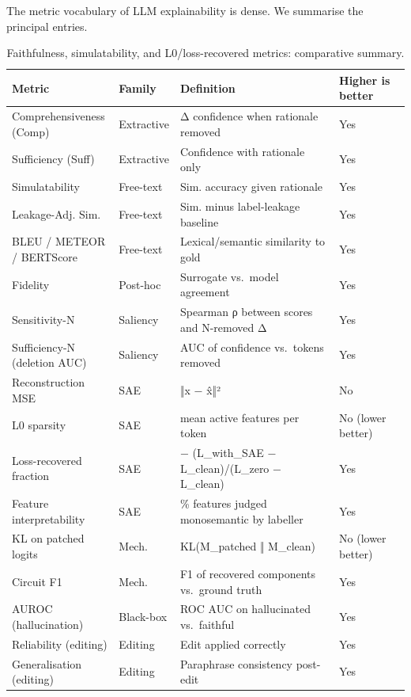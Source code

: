 \documentclass{article}
\begin{document}
The metric vocabulary of LLM explainability is dense. We summarise the principal entries.

\begin{table}[t]
\centering
\caption{Faithfulness, simulatability, and L0/loss-recovered metrics: comparative summary.}
\label{tab:faithfulness-simulatability-and-l0-loss-recovered-metrics}
\begin{tabular}{>{\raggedright\arraybackslash}p{0.2718\linewidth}
  >{\raggedright\arraybackslash}p{0.0971\linewidth}
  >{\raggedright\arraybackslash}p{0.4369\linewidth}
  >{\raggedright\arraybackslash}p{0.1942\linewidth}}
\toprule
Metric & Family & Definition & Higher is better \\
\midrule
Comprehensiveness (Comp) & Extractive & Δ confidence when rationale removed & Yes \\
Sufficiency (Suff) & Extractive & Confidence with rationale only & Yes \\
Simulatability & Free-text & Sim. accuracy given rationale & Yes \\
Leakage-Adj. Sim. & Free-text & Sim. minus label-leakage baseline & Yes \\
BLEU / METEOR / BERTScore & Free-text & Lexical/semantic similarity to gold & Yes \\
Fidelity & Post-hoc & Surrogate vs.~model agreement & Yes \\
Sensitivity-N & Saliency & Spearman ρ between scores and N-removed Δ & Yes \\
Sufficiency-N (deletion AUC) & Saliency & AUC of confidence vs.~tokens removed & Yes \\
Reconstruction MSE & SAE & ‖x − x̂‖² & No \\
L0 sparsity & SAE & mean active features per token & No (lower better) \\
Loss-recovered fraction & SAE & 1 − (L\_with\_SAE − L\_clean)/(L\_zero − L\_clean) & Yes \\
Feature interpretability & SAE & \% features judged monosemantic by labeller & Yes \\
KL on patched logits & Mech. & KL(M\_patched ‖ M\_clean) & No (lower better) \\
Circuit F1 & Mech. & F1 of recovered components vs.~ground truth & Yes \\
AUROC (hallucination) & Black-box & ROC AUC on hallucinated vs.~faithful & Yes \\
Reliability (editing) & Editing & Edit applied correctly & Yes \\
Generalisation (editing) & Editing & Paraphrase consistency post-edit & Yes \\

\end{tabular}
\end{table}
\end{document}

